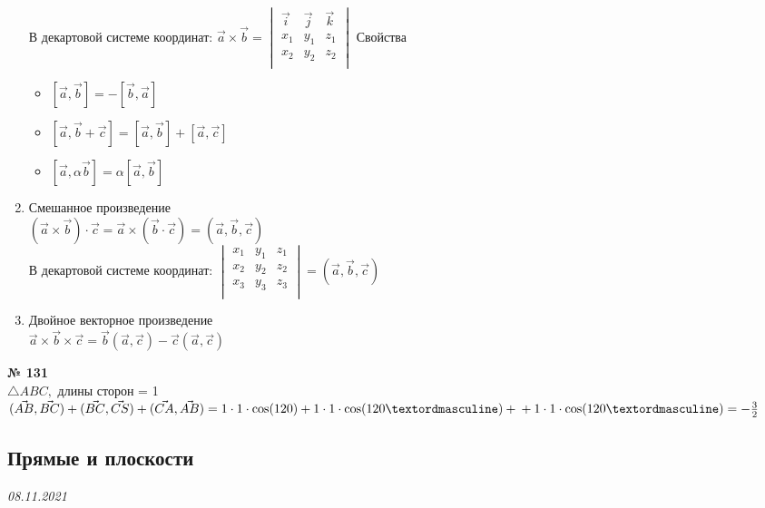 \documentclass[12pt]{article}
\newenvironment{task}[1][0]{\vspace{.5cm} {\textbf{№ #1} \vspace{.5cm}\\ }}{}
\begin{document}
\begin{enumerate}
{\begin{enumerate}
\end{enumerate}
В декартовой системе координат: 
$\vec{a} \times \vec{b} =
\begin{vmatrix}
	\vec{i} & \vec{j} & \vec{k}\\
	x_1 & y_1 & z_1\\
	x_2 & y_2 & z_2\\
\end{vmatrix}$
\newpage
Свойства
\begin{itemize}
	\item $[\vec{a}, \vec{b}]=-[\vec{b}, \vec{a}]$
	\item $[\vec{a}, \vec{b} + \vec{c}]=[\vec{a}, \vec{b}] + [\vec{a}, \vec{c}]$
	\item $[\vec{a}, \alpha \vec{b}] = \alpha [\vec{a}, \vec{b}]$
\end{itemize}
}
\item {Смешанное произведение\\
$(\vec{a} \times \vec{b}) \cdot \vec{c}=\vec{a} \times (\vec{b} \cdot \vec{c})=(\vec{a}, \vec{b}, \vec{c})$\\
В декартовой системе координат: 
$\begin{vmatrix}
	x_1 & y_1 & z_1\\
	x_2 & y_2 & z_2\\
	x_3 & y_3 & z_3\\
\end{vmatrix} = (\vec{a}, \vec{b}, \vec{c})$
}
\item{Двойное векторное произведение\\
$\vec{a} \times \vec{b} \times \vec{c} = \vec{b}(\vec{a}, \vec{c}) - \vec{c}(\vec{a}, \vec{c})$
}
\end{enumerate}

\begin{task}[131]
$\triangle ABC, $ длины сторон = 1\\
$(\vec{AB}, \vec{BC}) + (\vec{BC}, \vec{CS})+(\vec{CA}, \vec{AB}) = 1\cdot 1 \cdot \cos(120) + 1\cdot 1 \cdot \cos(120º)+\\+ 1\cdot 1 \cdot \cos(120º)=-\frac{3}{2}$\\

\end{task}

\newpage
\subsection{Прямые и плоскости}
{\hfill \textit{08.11.2021}\vspace{.5cm}}
\end{document}
